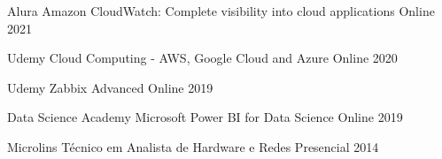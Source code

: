\begin{cvhonors}
  \cvhonor
    {Alura} %
    {Amazon CloudWatch: Complete visibility into cloud applications} %
    {Online} %
    {2021} %

  \cvhonor
    {Udemy} %
    {Cloud Computing - AWS, Google Cloud and Azure} %
    {Online} %
    {2020} %

  \cvhonor
    {Udemy} %
    {Zabbix Advanced} %
    {Online} %
    {2019} %

  \cvhonor
    {Data Science Academy} %
    {Microsoft Power BI for Data Science} %
    {Online} %
    {2019} %

  \cvhonor
    {Microlins} %
    {Técnico em Analista de Hardware e Redes} %
    {Presencial} %
    {2014} %
\end{cvhonors}
